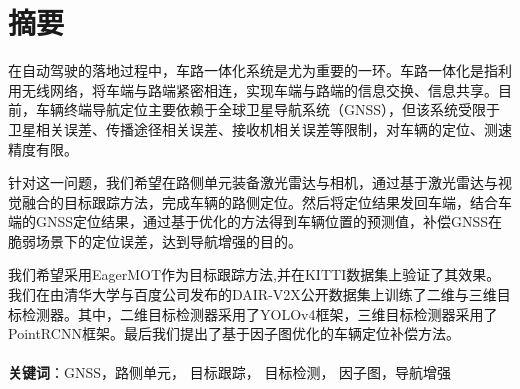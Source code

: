 \newpage
{}

\section*{摘\quad 要}

\hspace{8mm}

在自动驾驶的落地过程中，车路一体化系统是尤为重要的一环。车路一体化是指利用无线网络，将车端与路端紧密相连，实现车端与路端的信息交换、信息共享。目前，车辆终端导航定位主要依赖于全球卫星导航系统（GNSS），但该系统受限于卫星相关误差、传播途径相关误差、接收机相关误差等限制，对车辆的定位、测速精度有限。\par

针对这一问题，我们希望在路侧单元装备激光雷达与相机，通过基于激光雷达与视觉融合的目标跟踪方法，完成车辆的路侧定位。然后将定位结果发回车端，结合车端的GNSS定位结果，通过基于优化的方法得到车辆位置的预测值，补偿GNSS在脆弱场景下的定位误差，达到导航增强的目的。\par

我们希望采用EagerMOT作为目标跟踪方法,并在KITTI\cite{geiger2013vision}数据集上验证了其效果。我们在由清华大学与百度公司发布的DAIR-V2X公开数据集上训练了二维与三维目标检测器。其中，二维目标检测器采用了YOLOv4框架，三维目标检测器采用了PointRCNN框架。最后我们提出了基于因子图优化的车辆定位补偿方法。\\

~\\
\textbf{关键词}：GNSS，路侧单元， 目标跟踪， 目标检测， 因子图，导航增强\\
